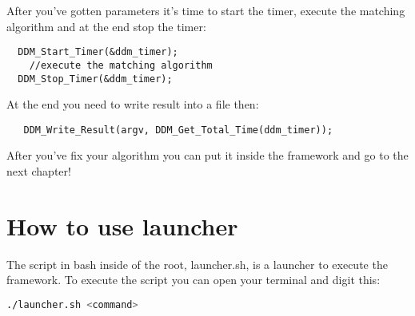 \documentclass[a4paper,11pt]{report}
\begin{document}
 After you've gotten parameters it's time to start the timer, execute the matching algorithm and
 at the end stop the timer:
 \begin{lstlisting}
  DDM_Start_Timer(&ddm_timer);
    //execute the matching algorithm
  DDM_Stop_Timer(&ddm_timer);
 \end{lstlisting}

  At the end you need to write result into a file then:
  \begin{lstlisting}
   DDM_Write_Result(argv, DDM_Get_Total_Time(ddm_timer));
  \end{lstlisting}
  
  After you've fix your algorithm you can put it inside the framework and go to the next chapter!
 
 \chapter{How to use launcher}
 
 The script in bash inside of the root, launcher.sh, is a launcher to execute the framework.
 To execute the script you can open your terminal and digit this:
 \begin{lstlisting}[language=bash]
  ./launcher.sh <command>
 \end{lstlisting}
\end{document}
